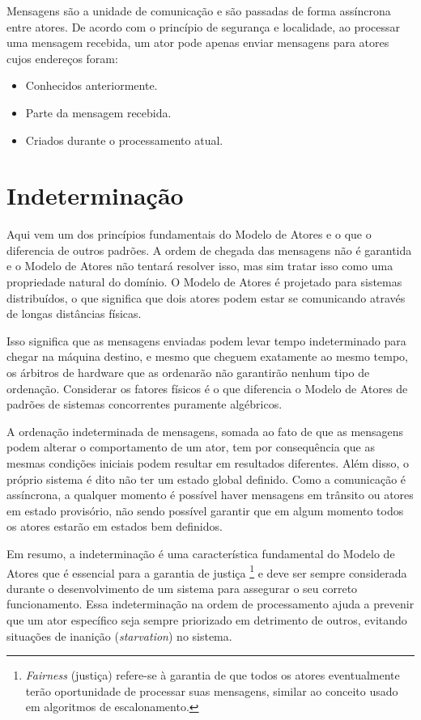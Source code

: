 Mensagens são a unidade de comunicação e são passadas de forma assíncrona entre atores. De acordo com o princípio de segurança e localidade, ao processar uma mensagem recebida, um ator pode apenas enviar mensagens para atores cujos endereços foram:

\begin{itemize}
    \item Conhecidos anteriormente.
    \item Parte da mensagem recebida.
    \item Criados durante o processamento atual.
\end{itemize}

\section{Indeterminação}

Aqui vem um dos princípios fundamentais do Modelo de Atores e o que o diferencia de outros padrões. A ordem de chegada das mensagens não é garantida e o Modelo de Atores não tentará resolver isso, mas sim tratar isso como uma propriedade natural do domínio. O Modelo de Atores é projetado para sistemas distribuídos, o que significa que dois atores podem estar se comunicando através de longas distâncias físicas.

Isso significa que as mensagens enviadas podem levar tempo indeterminado
para chegar na máquina destino, e mesmo que cheguem exatamente ao mesmo tempo, os árbitros de hardware que as ordenarão não garantirão nenhum tipo de ordenação. Considerar os fatores físicos é o que diferencia o Modelo de Atores de padrões de sistemas concorrentes puramente algébricos.

A ordenação indeterminada de mensagens, somada ao fato de que as mensagens podem alterar o comportamento de um ator, tem por consequência que as mesmas condições iniciais podem resultar em resultados diferentes. Além disso, o próprio sistema é dito não ter um estado global definido. Como a comunicação é assíncrona, a qualquer momento é possível haver mensagens em trânsito ou atores em estado provisório, não sendo possível garantir que em algum momento todos os atores
estarão em estados bem definidos.

Em resumo, a indeterminação é uma característica fundamental do Modelo de Atores que é essencial para a garantia de justiça
\footnote{\textit{Fairness} (justiça) refere-se à garantia de que todos os atores eventualmente terão oportunidade de processar suas mensagens, similar ao conceito usado em algoritmos de escalonamento.}
e deve ser sempre considerada durante o desenvolvimento de um sistema para assegurar o seu correto funcionamento. Essa indeterminação na ordem de processamento ajuda a prevenir que um ator específico seja sempre priorizado em detrimento de outros, evitando situações de inanição (\textit{starvation}) no sistema.

